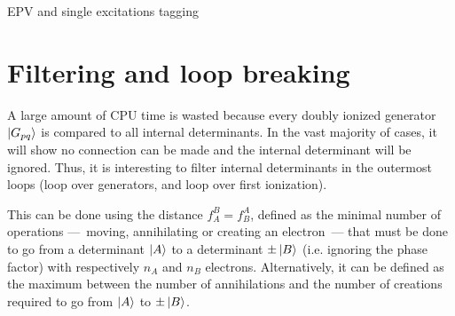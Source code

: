 \documentclass[./thesis.tex]{subfiles}
\begin{document}
\begin{algorithm}
        \caption{EPV and single excitations tagging}
        \label{alg:unblock_single}

                        
\end{algorithm}



\section{Filtering and loop breaking}

A large amount of CPU time is wasted because every doubly ionized generator $\ket {G_{pq}}$ is compared to all internal determinants. In the vast majority of cases, it will show no connection can be made and the internal determinant will be ignored. Thus, it is interesting to filter internal determinants in the outermost loops (loop over generators, and loop over first ionization).

This can be done using the distance $f_A^B = f_B^A$, defined as the minimal number of operations ---~moving, annihilating or creating an electron~--- that must be done to go from a determinant $\ket A$ to a determinant $\pm \ket B$ (i.e. ignoring the phase factor) with respectively $n_A$ and $n_B$ electrons.
Alternatively, it can be defined as the maximum between the number of annihilations and the number of creations required to go from $\ket A$ to $\pm \ket B$.
\end{document}
